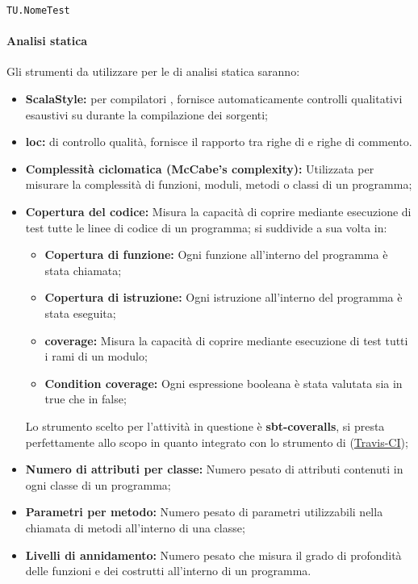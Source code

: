 \documentclass{scalatekids-article}
\begin{document}
\begin{center}
  \verb=TU.NomeTest=
\end{center}

\paragraph{Analisi statica}
\label{sec:AnalisiStatica}

Gli strumenti da utilizzare per le  di analisi statica saranno:
\begin{itemize}
\item\textbf{ScalaStyle:}  per compilatori , fornisce automaticamente controlli qualitativi esaustivi su  durante la compilazione dei sorgenti;
\item\textbf{loc:}  di controllo qualità, fornisce il rapporto tra righe di  e righe di commento.
\item\textbf{Complessità ciclomatica (McCabe's complexity):} Utilizzata per
  misurare la complessità di funzioni, moduli, metodi o classi di un
  programma;
\item\textbf{Copertura del codice:} Misura la capacità di coprire mediante
  esecuzione di test tutte le linee di codice di un programma; si
  suddivide a sua volta in:
  \begin{itemize}
  \item\textbf{Copertura di funzione:} Ogni funzione all'interno del
    programma è stata chiamata;
  \item\textbf{Copertura di istruzione:} Ogni istruzione all'interno
    del programma è stata eseguita;
  \item\textbf{ coverage:} Misura la capacità di coprire
    mediante esecuzione di test tutti i rami di un modulo;
  \item\textbf{Condition coverage:} Ogni espressione booleana è stata
    valutata sia in true che in false;
  \end{itemize}
  Lo strumento scelto per l'attività in questione è \textbf{sbt-coveralls}, si
  presta perfettamente allo scopo in quanto integrato con lo strumento di
   (\hyperref[sec:travis]{Travis-CI});
\item\textbf{Numero di attributi per classe:} Numero pesato di attributi
  contenuti in ogni classe di un programma;
\item\textbf{Parametri per metodo:} Numero pesato di parametri utilizzabili
  nella chiamata di metodi all'interno di una classe;
\item\textbf{Livelli di annidamento:} Numero pesato che misura il grado di
  profondità delle funzioni e dei costrutti all'interno di un programma.
\end{itemize}
\end{document}
